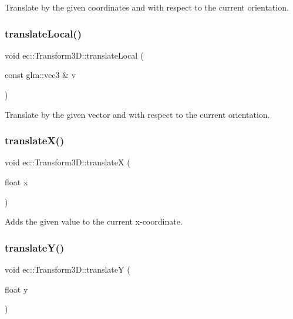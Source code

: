 Translate by the given coordinates and with respect to the current orientation. \mbox{\label{classec_1_1_transform3_d_a8769dc2eb4f1cd467d8e39c85decdd10}} 
\subsubsection{\texorpdfstring{translate\+Local()}{translateLocal()}\hspace{0.1cm}{\footnotesize\ttfamily [2/2]}}
{\footnotesize\ttfamily void ec\+::\+Transform3\+D\+::translate\+Local (\begin{DoxyParamCaption}\item[{const glm\+::vec3 \&}]{v }\end{DoxyParamCaption})}

Translate by the given vector and with respect to the current orientation. \mbox{\label{classec_1_1_transform3_d_a6e8e6da470c6a080b669cd619e8554ef}} 
\subsubsection{\texorpdfstring{translate\+X()}{translateX()}}
{\footnotesize\ttfamily void ec\+::\+Transform3\+D\+::translateX (\begin{DoxyParamCaption}\item[{float}]{x }\end{DoxyParamCaption})}

Adds the given value to the current x-\/coordinate. \mbox{\label{classec_1_1_transform3_d_ab0c9d7ff73b744c480914b7d2aaabf81}} 
\subsubsection{\texorpdfstring{translate\+Y()}{translateY()}}
{\footnotesize\ttfamily void ec\+::\+Transform3\+D\+::translateY (\begin{DoxyParamCaption}\item[{float}]{y }\end{DoxyParamCaption})}

